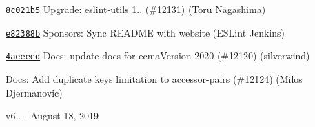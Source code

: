 \begin{DoxyItemize}
\item \href{https://github.com/eslint/eslint/commit/8c021b5917b3aa3c578ffe3972106d0a6bcf0838}{\texttt{ {\ttfamily 8c021b5}}} Upgrade\+: eslint-\/utils 1.. (\#12131) (Toru Nagashima)
\item \href{https://github.com/eslint/eslint/commit/e82388bd87717430200ec554634cc08806e38d3c}{\texttt{ {\ttfamily e82388b}}} Sponsors\+: Sync R\+E\+A\+D\+ME with website (E\+S\+Lint Jenkins)
\item \href{https://github.com/eslint/eslint/commit/4aeeeedb656ee3519ea82ebf0cb41ca801215046}{\texttt{ {\ttfamily 4aeeeed}}} Docs\+: update docs for ecma\+Version 2020 (\#12120) (silverwind)
\item \href{https://github.com/eslint/eslint/commit/6886148d1f528659ec3e125f61ef7a5f4c67556d}{\texttt{ {}}} Docs\+: Add duplicate keys limitation to accessor-\/pairs (\#12124) (Milos Djermanovic)
\end{DoxyItemize}

v6.. -\/ August 18, 2019


